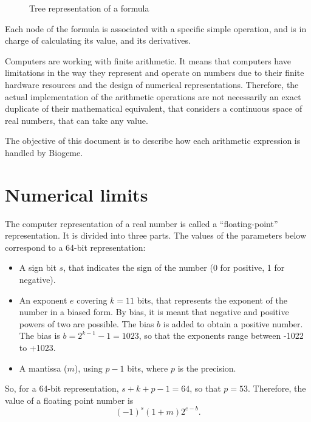 \documentclass[12pt,a4paper]{article}
\begin{document}
\begin{figure}[htb]
  \begin{center}
  \end{center}
\caption{\label{fig:tree}Tree representation of a formula}
\end{figure}

Each node of the formula is associated with a specific simple
operation, and is in charge of calculating its value, and its
derivatives.


Computers are working with finite arithmetic. It means that computers
have limitations in the way they represent and operate on numbers due
to their finite hardware resources and the design of numerical
representations.  Therefore, the actual implementation of the
arithmetic operations are not necessarily an exact duplicate of their
mathematical equivalent, that considers a continuous space of real
numbers, that can take any value.

The objective of this document is to describe how each arithmetic expression is handled by Biogeme. 

\section{Numerical limits}

The computer representation of a real number is called a ``floating-point'' representation. It is divided into three parts. The values of the parameters below correspond to a 64-bit representation:
\begin{itemize}
\item A sign bit $s$, that indicates the sign of the number (0 for positive, 1 for negative).
\item An exponent $e$ covering $k=11$ bits, that represents the exponent of the number in a biased form. By bias, it is meant that negative and positive powers of two are possible. The bias $b$ is added to obtain a positive number. The bias is $b=2^{k-1}-1=1023$, so that the exponents range between -1022 to +1023.
\item A mantissa ($m$), using $p-1$ bits, where $p$ is the precision. 
\end{itemize}
So, for a 64-bit representation, $s+k+p-1=64$, so that $p=53$.
Therefore, the value of a floating point number is
\[
(-1)^s (1+m) 2^{e-b}.
\]
\end{document}
